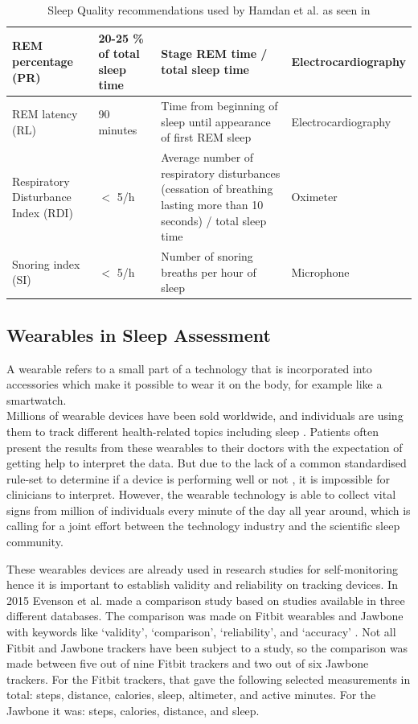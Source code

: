 \documentclass[12pt]{article} %
\begin{document}
\begin{table}[H]
\begin{footnotesize}
\begin{tabular}{|p{4cm} |p{2.6cm} |p{4cm} |p{3.3cm} |}
	\hline
	REM percentage (PR) & 20-25 \% of total sleep time & Stage REM time / total sleep time & Electrocardiography\\
	\hline
	REM latency (RL) & 90 minutes & Time from beginning of sleep until appearance of first REM sleep & Electrocardiography\\
	\hline
	Respiratory Disturbance Index (RDI) & $<$ 5/h & Average number of respiratory disturbances (cessation of breathing lasting more than 10 seconds) / total sleep time & Oximeter\\
	\hline
	Snoring index (SI) & $<$ 5/h & Number of snoring breaths per hour of sleep & Microphone\\
	\hline
	\end{tabular}
	\caption{Sleep Quality recommendations used by Hamdan et al. as seen in \cite{Hamdan2012ABS}}
	\label{tab:sleepQuality}
\end{footnotesize}
\end{table}

\subsection{Wearables in Sleep Assessment}
A wearable refers to a small part of a technology that is incorporated into accessories which make it possible to wear it on the body, for example like a smartwatch. \\

Millions of wearable devices have been sold worldwide, and individuals are using them to track different health-related topics including sleep \cite{boom}. Patients often present the results from these wearables to their doctors with the expectation of getting help to interpret the data. But due to the lack of a common standardised rule-set to determine if a device is performing well or not \cite{boom}, it is impossible for clinicians to interpret. However, the wearable technology is able to collect vital signs from million of individuals every minute of the day all year around, which is calling for a joint effort between the technology industry and the scientific sleep community. 

These wearables devices are already used in research studies for self-monitoring \cite{systematic} hence it is important to establish validity and reliability on tracking devices. In 2015 Evenson et al. made a comparison study based on studies available in three different databases. The comparison was made on Fitbit wearables and Jawbone with keywords like `validity', `comparison', `reliability', and `accuracy' \cite{systematic}. Not all Fitbit and Jawbone trackers have been subject to a study, so the comparison was made between five out of nine Fitbit trackers and two out of six Jawbone trackers. For the Fitbit trackers, that gave the following selected measurements in total: steps, distance, calories, sleep, altimeter, and active minutes. For the Jawbone it was: steps, calories, distance, and sleep. \\
\end{document}
